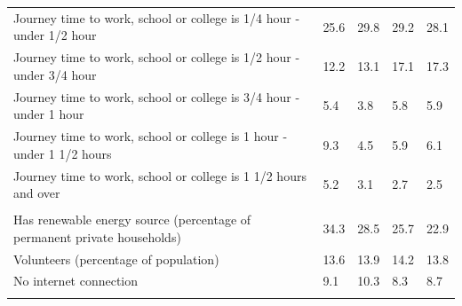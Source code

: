 \documentclass{article}
\begin{document}
\begin{table}[h]
\begin{tabular}{KTTTT}
Journey time to work, school or college is 1/4 hour - under 1/2 hour & 25.6& 29.8& 29.2& 28.1\\
Journey time to work, school or college is 1/2 hour - under 3/4 hour & 12.2& 13.1& 17.1& 17.3\\
Journey time to work, school or college is 3/4 hour - under 1 hour & 5.4& 3.8& 5.8& 5.9\\
Journey time to work, school or college is 1 hour - under 1 1/2 hours & 9.3& 4.5& 5.9& 6.1\\
Journey time to work, school or college is 1 1/2 hours and over & 5.2& 3.1& 2.7& 2.5\\
\hline
    \\ 
    \hline
Has renewable energy source (percentage of permanent private households) & 34.3& 28.5& 25.7& 22.9\\
    \hline
Volunteers (percentage of population) & 13.6& 13.9& 14.2& 13.8\\
    \hline
No internet connection&  9.1& 10.3&  8.3&  8.7\\
\hline
\end{tabular}
\end{table}
\end{document}
